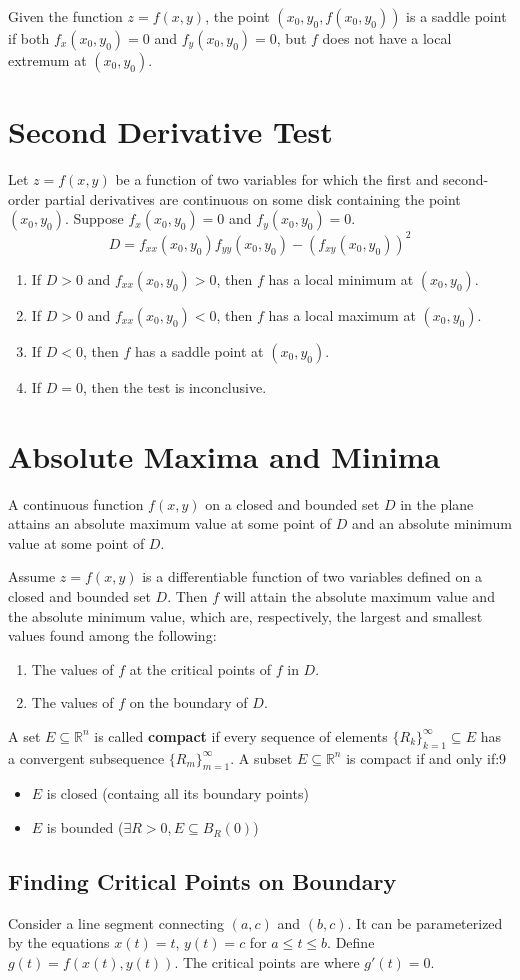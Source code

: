 \documentclass{article}
\begin{document}
Given the function $z=f(x,y)$, the point $(x_0,y_0,f(x_0,y_0))$ is a saddle point if both $f_x(x_0,y_0)=0$ and $f_y(x_0,y_0)=0$, but $f$ does not have a local extremum at $(x_0,y_0)$.

\section*{Second Derivative Test}

Let $z=f(x,y)$ be a function of two variables for which the first and second-order partial derivatives are continuous on some disk containing the point $(x_0,y_0)$. Suppose $f_x(x_0,y_0)=0$ and $f_y(x_0,y_0)=0$.
\[D=f_{xx}(x_0,y_0)f_{yy}(x_0,y_0)-{(f_{xy}(x_0,y_0))}^2\]
\begin{enumerate}
    \item If $D>0$ and $f_{xx}(x_0,y_0)>0$, then $f$ has a local minimum at $(x_0,y_0)$.
    \item If $D>0$ and $f_{xx}(x_0,y_0)<0$, then $f$ has a local maximum at $(x_0,y_0)$.
    \item If $D<0$, then $f$ has a saddle point at $(x_0,y_0)$.
    \item If $D=0$, then the test is inconclusive.
\end{enumerate}

\section*{Absolute Maxima and Minima}

A continuous function $f(x,y)$ on a closed and bounded set $D$ in the plane attains an absolute maximum value at some point of $D$ and an absolute minimum value at some point of $D$.
\vspace{1em}

Assume $z=f(x,y)$ is a differentiable function of two variables defined on a closed and bounded set $D$. Then $f$ will attain the absolute maximum value and the absolute minimum value, which are, respectively, the largest and smallest values found among the following:
\begin{enumerate}
    \item The values of $f$ at the critical points of $f$ in $D$.
    \item The values of $f$ on the boundary of $D$.
\end{enumerate}

A set $E\subseteq\mathbb{R}^n$ is called \textbf{compact} if every sequence of elements ${\{R_k\}}^\infty_{k=1}\subseteq E$ has a convergent subsequence ${\{R_m\}}^\infty_{m=1}$. A subset $E\subseteq\mathbb{R}^n$ is compact if and only if:9
\begin{itemize}
    \item $E$ is closed (containg all its boundary points)
    \item $E$ is bounded ($\exists R > 0, E\subseteq B_R(0)$)
\end{itemize}

\subsection*{Finding Critical Points on Boundary}
Consider a line segment connecting $(a,c)$ and $(b,c)$. It can be parameterized by the equations $x(t)=t$, $y(t)=c$ for $a\leq t\leq b$. Define $g(t)=f(x(t),y(t))$. The critical points are where $g'(t)=0$.
\end{document}
